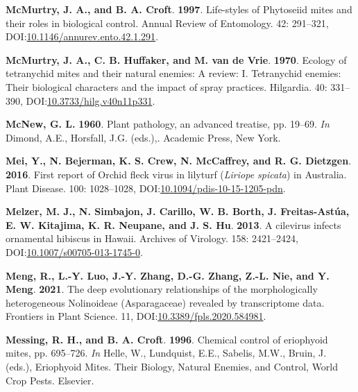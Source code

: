\documentclass[12pt,final,CPage]{ufthesis}
\newlength{\cslhangindent}
\newenvironment{CSLReferences}[2] %
{%
	\setlength{\parindent}{0pt}
	\ifodd #1 \everypar{\setlength{\hangindent}{\cslhangindent}}\ignorespaces\fi
	\ifnum #2 > 0
	\setlength{\parskip}{#2\baselineskip}
	\fi
}%
{}
\begin{document}
{\begin{CSLReferences}{1}{0}
  \leavevmode{}%
  \textbf{McMurtry, J. A., and B. A. Croft}. \textbf{1997}. Life-styles of {Phytoseiid} mites and their roles in biological control. Annual Review of Entomology. 42: 291--321, DOI:\href{https://doi.org/10.1146/annurev.ento.42.1.291}{10.1146/annurev.ento.42.1.291}.

  \leavevmode{}%
  \textbf{McMurtry, J. A., C. B. Huffaker, and M. van de Vrie}. \textbf{1970}. Ecology of tetranychid mites and their natural enemies: A review: I. Tetranychid enemies: Their biological characters and the impact of spray practices. Hilgardia. 40: 331--390, DOI:\href{https://doi.org/10.3733/hilg.v40n11p331}{10.3733/hilg.v40n11p331}.

  \leavevmode{}%
  \textbf{McNew, G. L.} \textbf{1960}. Plant pathology, an advanced treatise, pp. 19--69. \emph{In} Dimond, A.E., Horsfall, J.G. (eds.),. Academic Press, New York.

  \leavevmode{}%
  \textbf{Mei, Y., N. Bejerman, K. S. Crew, N. McCaffrey, and R. G. Dietzgen}. \textbf{2016}. First report of {Orchid fleck virus} in lilyturf {(\emph{Liriope spicata})} in {Australia}. Plant Disease. 100: 1028--1028, DOI:\href{https://doi.org/10.1094/pdis-10-15-1205-pdn}{10.1094/pdis-10-15-1205-pdn}.

  \leavevmode{}%
  \textbf{Melzer, M. J., N. Simbajon, J. Carillo, W. B. Borth, J. Freitas-Astúa, E. W. Kitajima, K. R. Neupane, and J. S. Hu}. \textbf{2013}. A cilevirus infects ornamental hibiscus in {Hawaii}. Archives of Virology. 158: 2421--2424, DOI:\href{https://doi.org/10.1007/s00705-013-1745-0}{10.1007/s00705-013-1745-0}.

  \leavevmode{}%
  \textbf{Meng, R., L.-Y. Luo, J.-Y. Zhang, D.-G. Zhang, Z.-L. Nie, and Y. Meng}. \textbf{2021}. The deep evolutionary relationships of the morphologically heterogeneous {Nolinoideae} ({Asparagaceae}) revealed by transcriptome data. Frontiers in Plant Science. 11, DOI:\href{https://doi.org/10.3389/fpls.2020.584981}{10.3389/fpls.2020.584981}.

  \leavevmode{}%
  \textbf{Messing, R. H., and B. A. Croft}. \textbf{1996}. Chemical control of eriophyoid mites, pp. 695--726. \emph{In} Helle, W., Lundquist, E.E., Sabelis, M.W., Bruin, J. (eds.), Eriophyoid Mites. Their Biology, Natural Enemies, and Control, World Crop Pests. Elsevier.


\end{CSLReferences}}
\end{document}
